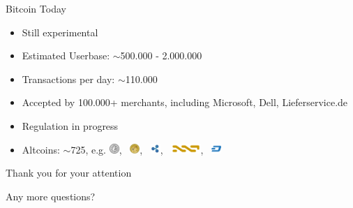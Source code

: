 \documentclass[12pt, usepdftitle=false]{beamer}
\begin{document}
\begin{frame}{Bitcoin Today}
\begin{itemize}
	\pause\item Still experimental
	\pause\item Estimated Userbase: $\sim$500.000 - 2.000.000
	\pause\item Transactions per day: $\sim$110.000
	\pause\item Accepted by 100.000+ merchants, including Microsoft, Dell, Lieferservice.de
	\pause\item Regulation in progress
	\pause\item Altcoins: $\sim$725, e.g. 
\includegraphics[height=1em]{litecoin.png},~ 
\includegraphics[height=1em]{doge.png},~ 
\includegraphics[height=1em]{ripple-sm},~ 
\includegraphics[height=1em]{nxt.png},~ 
\includegraphics[height=1em]{dash.png}
\end{itemize}

\end{frame}


\begin{frame}{Thank you for your attention}

\begin{center}
	\pause

	Any more questions?
\end{center}
\end{frame}

\end{document}
